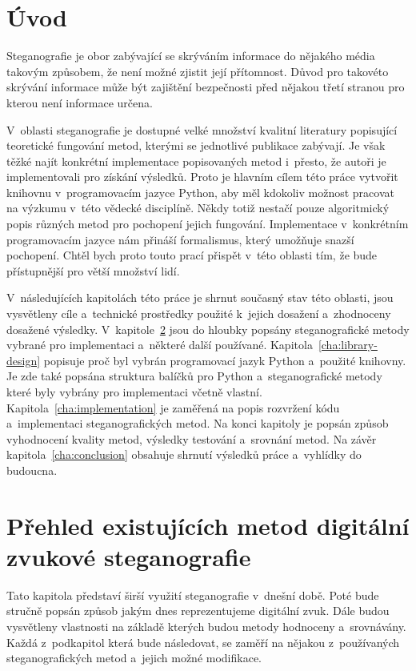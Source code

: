 \chapter{Úvod}
\label{cha:introduction}

Steganografie je obor zabývající se skrýváním informace do nějakého média
takovým způsobem, že není možné zjistit její přítomnost. Důvod pro takovéto
skrývání informace může být zajištění bezpečnosti před nějakou třetí stranou
pro kterou není informace určena. 

V~oblasti steganografie je dostupné velké množství kvalitní literatury
popisující teoretické fungování metod, kterými se jednotlivé publikace
zabývají. Je však těžké najít konkrétní implementace popisovaných metod
i~přesto, že autoři je implementovali pro získání výsledků. Proto je hlavním
cílem této práce vytvořit knihovnu v~programovacím jazyce Python, aby měl
kdokoliv možnost pracovat na výzkumu v~této vědecké disciplíně. Někdy totiž
nestačí pouze algoritmický popis různých metod pro pochopení jejich fungování.
Implementace v~konkrétním programovacím jazyce nám přináší formalismus, který
umožňuje snazší pochopení. Chtěl bych proto touto prací přispět v~této oblasti
tím, že bude přístupnější pro větší množství lidí.

V~následujících kapitolách této práce je shrnut současný stav této oblasti,
jsou vysvětleny cíle a~technické prostředky použité k~jejich dosažení
a~zhodnoceny dosažené výsledky. V~kapitole~\ref{cha:existing-methods}
 jsou do hloubky
popsány steganografické metody vybrané pro implementaci a~některé další
používané. Kapitola~\ref{cha:library-design} popisuje proč byl vybrán
programovací jazyk Python a~použité knihovny. Je zde také popsána struktura
balíčků pro Python a~steganografické metody které byly vybrány pro implementaci
včetně vlastní. Kapitola~\ref{cha:implementation} je zaměřená na popis
rozvržení kódu a~implementaci steganografických metod. Na konci kapitoly je
popsán způsob vyhodnocení kvality metod, výsledky testování a~srovnání metod.
Na závěr kapitola~\ref{cha:conclusion} obsahuje shrnutí výsledků práce
a~vyhlídky do budoucna.


\chapter{Přehled existujících metod digitální zvukové steganografie}
\label{cha:existing-methods}

Tato kapitola představí širší využití steganografie v~dnešní době. Poté bude
stručně popsán způsob jakým dnes reprezentujeme digitální zvuk. Dále budou
vysvětleny vlastnosti na základě kterých budou metody hodnoceny a~srovnávány.
Každá z~podkapitol která bude následovat, se zaměří na nějakou z~používaných
steganografických metod a~jejich možné modifikace.

